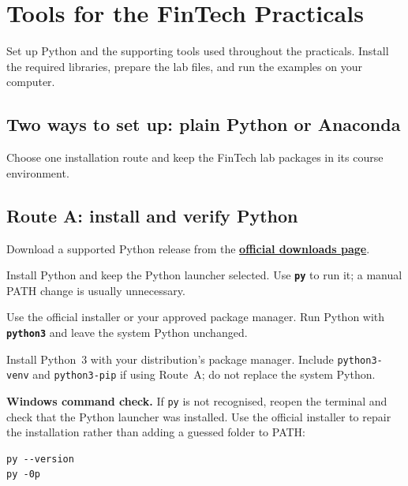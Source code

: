 \chapter{Tools for the FinTech Practicals}
\label{ch:toolkit}

\chapterguide%
  {Set up Python and the supporting tools used throughout the practicals.}%
  {Install the required libraries, prepare the lab files, and run the examples on your computer.}

\section{Two ways to set up: plain Python or Anaconda}

\begin{keyidea}
Choose one installation route and keep the FinTech lab packages in its course environment.
\end{keyidea}

\section{Route A: install and verify Python}

Download a supported Python release from the
\href{https://www.python.org/downloads/}{\textbf{official downloads page}}.

\begin{description}[leftmargin=1.15in,style=nextline]
  \item[Windows] Install Python and keep the Python launcher selected. Use
    \textbf{\texttt{py}} to run it; a manual PATH change is usually unnecessary.
  \item[macOS] Use the official installer or your approved package manager.
    Run Python with \textbf{\texttt{python3}} and leave the system Python unchanged.
  \item[Linux] Install Python~3 with your distribution's package manager.
    Include \texttt{python3-venv} and \texttt{python3-pip} if using Route~A;
    do not replace the system Python.
\end{description}

\textbf{Windows command check.} If \texttt{py} is not recognised, reopen the
terminal and check that the Python launcher was installed. Use the official
installer to repair the installation rather than adding a guessed folder to PATH:

\begin{lstlisting}[style=utpterminal]
py --version
py -0p
\end{lstlisting}


